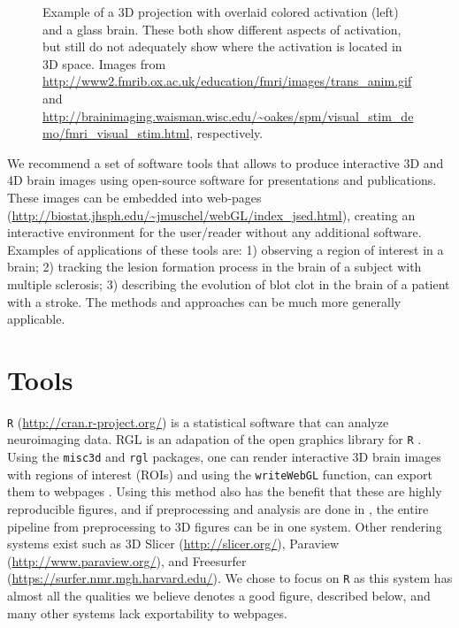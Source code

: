 \documentclass[final]{beamer}\usepackage{graphicx, color}
\begin{document}
\begin{frame}[fragile]
\begin{multicols}{2}
\begin{figure}
\begin{minipage}[b]{3.5in}
  \end{minipage}\hfill  
  \begin{minipage}[b]{7in}
    \caption{
		Example of a 3D projection with overlaid colored activation (left) and a glass brain.  These both show different aspects of activation, but still do not adequately show where the activation is located in 3D space.  {\scriptsize Images from { \url{http://www2.fmrib.ox.ac.uk/education/fmri/images/trans_anim.gif}} and { \url{http://brainimaging.waisman.wisc.edu/~oakes/spm/visual_stim_demo/fmri_visual_stim.html}}, respectively.}
    }   \label{fig:others}
 \end{minipage}
\end{figure}


We recommend a set of software tools that allows to produce interactive 3D and 4D brain images using open-source software for presentations and publications. These images can be embedded into web-pages (\url{http://biostat.jhsph.edu/~jmuschel/webGL/index_jsed.html}), creating an interactive environment for the user/reader without any additional software. Examples of applications of these tools are: 1) observing a region of interest in a brain; 2) tracking the lesion formation process in the brain of a subject with multiple sclerosis; 3) describing the evolution of blot clot in the brain of a patient with a stroke. The methods and approaches can be much more generally applicable.

\section{Tools}
\texttt{R} (\href{http://cran.r-project.org/}{http://cran.r-project.org/}) is a statistical software that can analyze neuroimaging data.  RGL is an adapation of the open graphics library for \texttt{R} \cite{opengl}.  Using the \texttt{misc3d} and \texttt{rgl} packages, one can render interactive 3D brain images with regions of interest (ROIs) and using the \texttt{writeWebGL} function, can export them to webpages \citep{rgl, misc3d}.  Using this method also has the benefit that these are highly reproducible figures, and if preprocessing and analysis are done in , the entire pipeline from preprocessing to 3D figures can be in one system.  
Other rendering systems exist such as 3D Slicer (\href{http://slicer.org/}{http://slicer.org/}), Paraview (\href{http://www.paraview.org/}{http://www.paraview.org/}), and Freesurfer (\href{https://surfer.nmr.mgh.harvard.edu/}{https://surfer.nmr.mgh.harvard.edu/}).  We chose to focus on \texttt{R} as this system has almost all the qualities we believe denotes a good figure, described below, and many other systems lack exportability to webpages. 


\end{multicols}
\end{frame}
\end{document}
